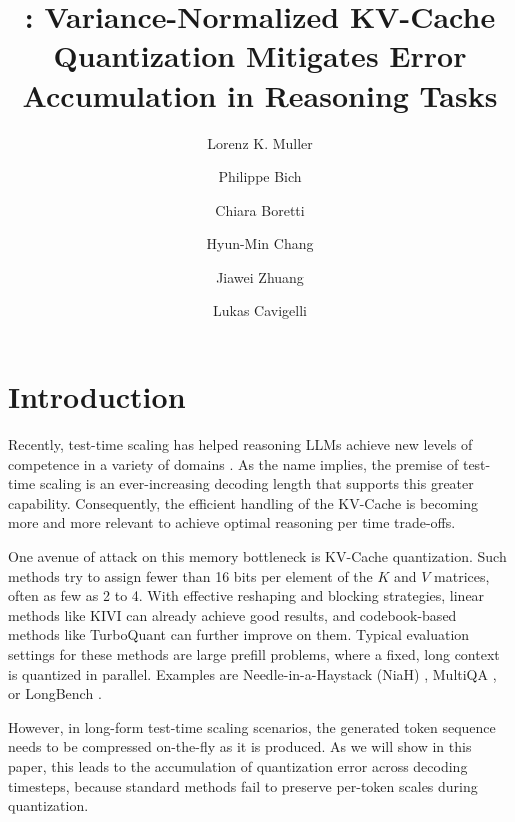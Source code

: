 \documentclass{llmxive}
\title{\methodname: Variance-Normalized KV-Cache Quantization Mitigates Error Accumulation in Reasoning Tasks}
\author{Lorenz K. Muller \and Philippe Bich \and Chiara Boretti \and Hyun-Min Chang \and Jiawei Zhuang \and Lukas Cavigelli}
\begin{document}
\maketitle
\begin{abstract}
%
\end{abstract}
% 


\section{Introduction}
Recently,  test-time scaling \cite{openai2024learning} has helped reasoning LLMs achieve new levels of competence in a variety of domains \cite{snell2025scaling, pmlr-v267-bi25a-Forest-of-Thought, muennighoff2025s1, shen2026thinking}. As the name implies, the premise of test-time scaling is an ever-increasing decoding length that supports this greater capability. Consequently, the efficient handling of the KV-Cache is becoming more and more relevant to achieve optimal reasoning per time trade-offs. 


One avenue of attack on this memory bottleneck is KV-Cache quantization. Such methods try to assign fewer than 16 bits per element of the $K$ and $V$ matrices, often as few as 2 to 4. With effective reshaping and blocking strategies, linear methods like KIVI \cite{KIVI} can already achieve good results, and codebook-based methods like TurboQuant \cite{zandieh2026turboquant} can further improve on them. 
Typical evaluation settings for these methods are large prefill problems, where a fixed, long context is quantized in parallel. Examples are Needle-in-a-Haystack (NiaH) \cite{kamradt2023needle}, MultiQA \cite{talmor-berant-2019-multiqa}, or LongBench \cite{bai2024longbench}. 

However, in long-form test-time scaling scenarios, the generated token sequence needs to be compressed on-the-fly as it is produced. As we will show in this paper, this leads to the accumulation of quantization error across decoding timesteps, because standard methods fail to preserve per-token scales during quantization. %
\end{document}
